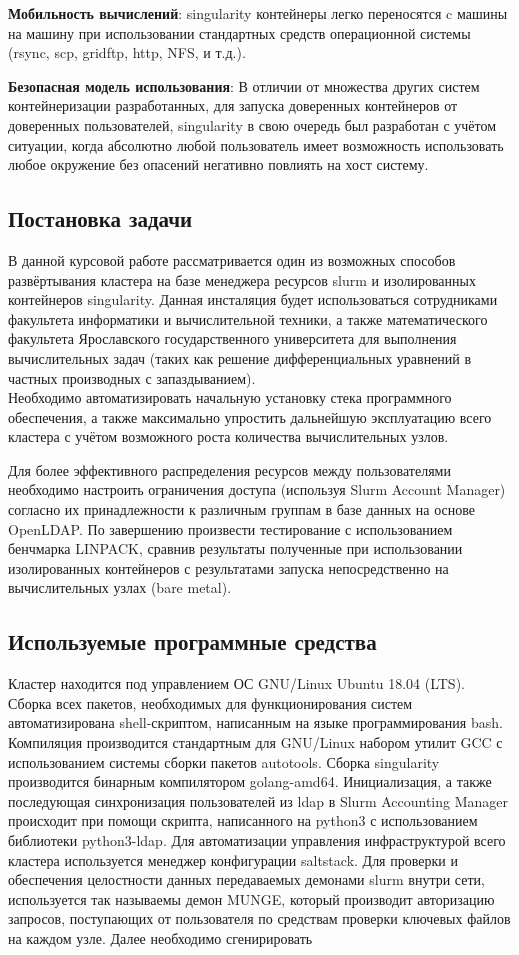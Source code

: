 \documentclass[a4paper]{extarticle}
\begin{document}
\textbf{Мобильность вычислений}: singularity контейнеры легко переносятся c машины на машину при  использовании стандартных средств операционной системы (rsync, scp, gridftp, http, NFS, и т.д.).

\textbf{Безопасная модель использования}: В отличии от множества других систем контейнеризации разработанных, для запуска доверенных контейнеров от доверенных пользователей, singularity в свою очередь был разработан с учётом ситуации, когда абсолютно любой пользователь имеет возможность использовать любое окружение без опасений негативно повлиять на хост систему.

\subsection*{Постановка задачи}

В данной курсовой работе рассматривается один из возможных способов развёртывания кластера на базе менеджера ресурсов slurm и изолированных контейнеров singularity. Данная инсталяция будет использоваться сотрудниками факультета информатики и вычислительной техники, а также математического факультета Ярославского государственного университета для выполнения вычислительных задач (таких как решение  дифференциальных уравнений в частных производных с запаздыванием).  \\ Необходимо автоматизировать начальную установку стека программного обеспечения, а также максимально упростить дальнейшую эксплуатацию всего кластера с учётом возможного роста количества
вычислительных узлов. 

Для более эффективного распределения ресурсов между пользователями необходимо настроить ограничения доступа (используя Slurm Account Manager) согласно их принадлежности к различным группам в базе данных на основе OpenLDAP. По завершению произвести тестирование с использованием бенчмарка LINPACK, сравнив результаты полученные при использовании изолированных контейнеров с результатами запуска непосредственно на вычислительных узлах (bare metal).

\subsection*{Используемые программные средства}

Кластер находится под управлением ОС GNU/Linux Ubuntu 18.04 (LTS). Сборка всех пакетов, необходимых для функционирования систем автоматизирована  shell-скриптом, написанным на языке программирования bash. Компиляция производится стандартным для GNU/Linux набором утилит GCC с использованием системы сборки пакетов autotools. Сборка singularity производится бинарным компилятором golang-amd64.
Инициализация, а также последующая синхронизация пользователей из ldap в Slurm Accounting Manager происходит при помощи скрипта, написанного на python3 с
использованием библиотеки python3-ldap. Для автоматизации управления инфраструктурой всего кластера используется менеджер конфигурации saltstack.
Для проверки и обеспечения целостности данных передаваемых демонами slurm внутри сети, используется так называемы демон MUNGE, который производит авторизацию запросов, поступающих от пользователя по средствам проверки ключевых файлов на каждом узле.
Далее необходимо сгенирировать 
\end{document}
